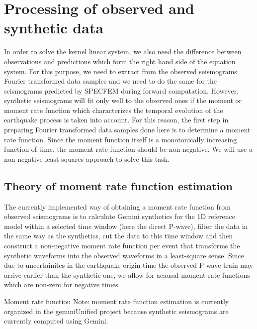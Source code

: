 %
\section{Processing of observed and synthetic data}
%
In order to solve the kernel linear system, we also need the difference between observations and predictions which form the right hand side of the equation system. For this purpose, we need to extract from the observed seismograms Fourier transformed data samples and we need to do the same for the seismograms predicted by SPECFEM during forward computation. However, synthetic seismograms will fit only well to the observed ones if the moment or moment rate function which characterizes the temporal evolution of the earthquake process is taken into account. For this reason, the first step in preparing Fourier transformed data samples done here is to determine a moment rate function. Since the moment function itself is a monotonically increasing function of time, the moment rate function should be non-negative. We will use a non-negative least squares approach to solve this task.
%
\subsection{Theory of moment rate function estimation}
 \label{sec:stf}
%
The currently implemented way of obtaining a moment rate function from observed seismograms is to calculate Gemini synthetics for the 1D reference model within a selected time window (here the direct P-wave), filter the data in the same way as the synthetics, cut the data to this time window and then construct a non-negative moment rate function per event that transforms the synthetic waveforms into the observed waveforms in a least-square sense. Since due to uncertainites in the earthquake origin time the observed P-wave train may arrive earlier than the synthetic one, we allow for acausal moment rate functions which are non-zero for negative times.
 \begin{infobox}[label={info:stf},float=h!]{Moment rate function}
   Note: moment rate function estimation is currently organized in the geminiUnified project because synthetic seismograms are currently computed using Gemini.
 \end{infobox}
%
